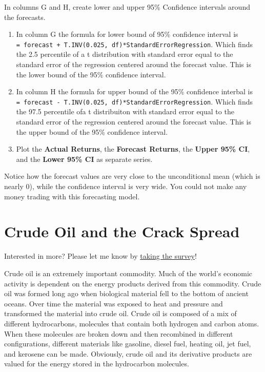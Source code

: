 \documentclass[
  letterpaper,
  DIV=11,
  numbers=noendperiod]{scrreprt}
\begin{document}
In columns G and H, create lower and upper 95\% Confidence intervals
around the forecasts.

\begin{enumerate}
\def\labelenumi{\arabic{enumi}.}
\setcounter{enumi}{9}
\item
  In column G the formula for lower bound of 95\% confidence interval is
  \texttt{=\ forecast\ +\ T.INV(0.025,\ df)*StandardErrorRegression}.
  Which finds the 2.5 percentile of a t distribution with standard error
  equal to the standard error of the regression centered around the
  forecast value. This is the lower bound of the 95\% confidence
  interval.
\item
  In column H the formula for upper bound of the 95\% confidence
  interbal is
  \texttt{=\ forecast\ -\ T.INV(0.025,\ df)*StandardErrorRegression}.
  Which finds the 97.5 percentile ofa t distribuiton with standard error
  equal to the standard error of the regression centered around the
  forecast value. This is the upper bound of the 95\% confidence
  interval.
\item
  Plot the \textbf{Actual Returns}, the \textbf{Forecast Returns}, the
  \textbf{Upper 95\% CI}, and the \textbf{Lower 95\% CI} as separate
  series.
\end{enumerate}

Notice how the forecast values are very close to the unconditional mean
(which is nearly 0), while the confidence interval is very wide. You
could not make any money trading with this forecasting model.


\hypertarget{crude-oil-and-the-crack-spread}{%
\chapter{Crude Oil and the Crack
Spread}\label{crude-oil-and-the-crack-spread}}

{Interested in more? Please let me know by}
\href{https://forms.gle/Q3VByCQZHjfQSy9D7}{taking the survey}!

Crude oil is an extremely important commodity. Much of the world's
economic activity is dependent on the energy products derived from this
commodity. Crude oil was formed long ago when biological material fell
to the bottom of ancient oceans. Over time the material was exposed to
heat and pressure and transformed the material into crude oil. Crude oil
is composed of a mix of different hydrocarbons, molecules that contain
both hydrogen and carbon atoms. When these molecules are broken down and
then recombined in different configurations, different materials like
gasoline, diesel fuel, heating oil, jet fuel, and kerosene can be made.
Obviously, crude oil and its derivative products are valued for the
energy stored in the hydrocarbon molecules.
\end{document}
